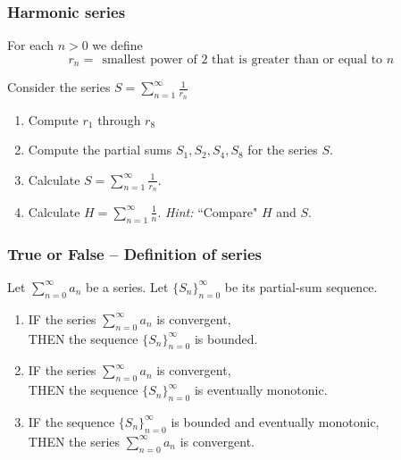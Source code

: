 \documentclass[14pt]{beamer}
\newcommand{\azul}[1]{{\color{blue} #1}}
\newcommand{\rojo}[1]{{\color{red} #1}}
\newcommand{\setsize}[1]{\fontsize{#1}{#1}\selectfont} %
\newcommand{\smallerfont}{\setsize{13}} %
\newcommand{\vv}{\vspace{.5cm}}
\begin{document}
	\begin{frame}[t]
		\smallerfont
		\frametitle{Harmonic series}

		For each $n >0$ we define
		\[
			r_{n} = \; \, \mbox{smallest power of $2$ that is greater than or equal to
			$n$}\,
		\]
		\vspace{-.7cm}

		Consider the series ${\displaystyle S = \sum_{n=1}^{\infty} \frac{1}{r_{n}}}$
		\vspace{.2cm}

		\begin{enumerate}
			\item Compute ${\displaystyle r_1}$ through ${\displaystyle r_8}$ \vv

			\item Compute the partial sums ${\displaystyle S_1, S_2, S_4, S_8}$ for the
				series $S$.
				\vspace{.2cm}

			\item Calculate ${\displaystyle S = \sum_{n=1}^{\infty} \frac{1}{r_{n}}}$.

			\item Calculate ${\displaystyle H = \sum_{n=1}^{\infty} \frac{1}{n}}$.
				\hfill \emph{Hint:} ``Compare" $H$ and $S$.
		\end{enumerate}
	\end{frame}
	\begin{frame}[t]
		\setsize{12}
		\frametitle{True or False -- Definition of series}

		Let ${\displaystyle \sum_{n=0}^{\infty} a_n}$ be a series. Let
		${\displaystyle \{ S_n \}_{n=0}^{\infty}}$ be its partial-sum sequence.

		\begin{enumerate}
			\item IF \azul{the series ${\displaystyle \sum_{n=0}^{\infty} a_n}$ is convergent},
				\\ THEN \rojo{the sequence ${\displaystyle \{ S_n \}_{n=0}^{\infty}}$ is bounded}.
				\vspace{.5cm}

			\item IF \azul{the series ${\displaystyle \sum_{n=0}^{\infty} a_n}$ is convergent},
				\\ THEN \rojo{the sequence ${\displaystyle \{ S_n \}_{n=0}^{\infty}}$ is eventually monotonic}.
				\vspace{.8cm}

			\item IF \rojo{the sequence ${\displaystyle \{ S_n \}_{n=0}^{\infty}}$ is bounded and eventually monotonic},
				\\ THEN \azul{the series ${\displaystyle \sum_{n=0}^{\infty} a_n}$ is convergent}.
		\end{enumerate}
	\end{frame}
\end{document}
